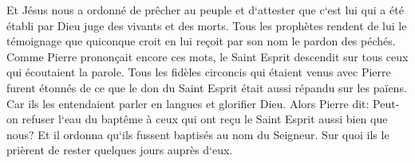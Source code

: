 \verse Et Jésus nous a ordonné de prêcher au peuple et d`attester que c`est lui qui a été établi par Dieu juge des vivants et des morts. 
\verse Tous les prophètes rendent de lui le témoignage que quiconque croit en lui reçoit par son nom le pardon des péchés. 
\verse Comme Pierre prononçait encore ces mots, le Saint Esprit descendit sur tous ceux qui écoutaient la parole. 
\verse Tous les fidèles circoncis qui étaient venus avec Pierre furent étonnés de ce que le don du Saint Esprit était aussi répandu sur les païens. 
\verse Car ils les entendaient parler en langues et glorifier Dieu. 
\verse Alors Pierre dit: Peut-on refuser l`eau du baptême à ceux qui ont reçu le Saint Esprit aussi bien que nous? 
\verse Et il ordonna qu`ils fussent baptisés au nom du Seigneur. Sur quoi ils le prièrent de rester quelques jours auprès d`eux. 

